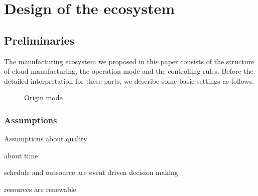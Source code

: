 \section{Design of the ecosystem} %
\label{sec:design_of_the_ecosystem}
\subsection{Preliminaries} %
\label{sub:preliminaries}
The manufacturing ecosystem we proposed in this paper consists of the structure of cloud manufacturing, the operation mode and the controlling rules. Before the detailed interpretation for these parts, we describe some basic settings as follows.

\begin{figure}[htbp]
    \centering
    \resizebox{0.9\textwidth}{!}{}
    \caption{Origin mode}
    \label{fig:originmode}
\end{figure}

\subsubsection{Assumptions} %
\label{ssub:assumptions_nomenclature}
Assumptions about quality

about time

schedule and outsource are event driven decision making 

resources are renewable

